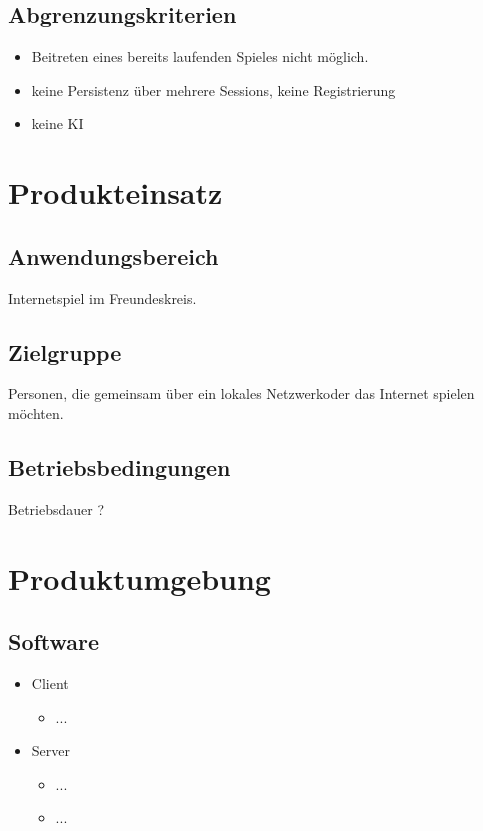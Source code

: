 \documentclass{article}
\begin{document}
\subsection{Abgrenzungskriterien}
\begin{itemize}
	\item Beitreten eines bereits laufenden Spieles nicht möglich.
	\item keine Persistenz über mehrere Sessions, keine Registrierung
	\item keine KI
\end{itemize}

\section{Produkteinsatz}
\subsection{Anwendungsbereich}
Internetspiel im Freundeskreis.
\subsection{Zielgruppe}
Personen, die gemeinsam über ein lokales Netzwerkoder das Internet spielen möchten. 
\subsection{Betriebsbedingungen}
Betriebsdauer ?

\section{Produktumgebung}
\subsection{Software}
	\begin{itemize}
		\item \gls{Client}
		\begin{itemize}
			\item ...
		\end{itemize}
		\item \gls{Server}
		\begin{itemize}
			\item ...	
			\item ...
		\end{itemize}
	\end{itemize}
\end{document}

